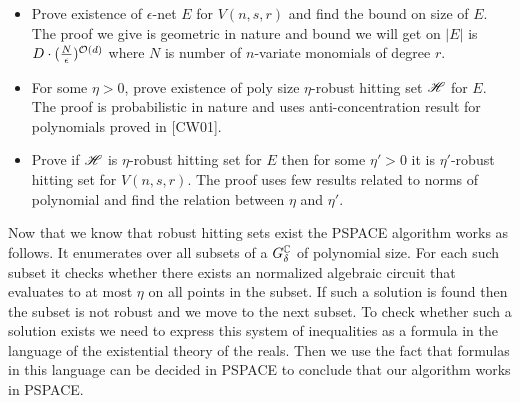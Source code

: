 {\begin{itemize}
\item Prove existence of $\epsilon$-net $E$ for $V(n,s,r)$ and find the bound on size of $E$. The proof we give is geometric in nature and bound we will get on $|E|$ is $D\cdot(\frac{N}{\epsilon})^{\mathcal{O}(d)}$ where $N$ is number of $n$-variate monomials of degree $r$.
\item For some $\eta>0$, prove existence of poly size $\eta$-robust hitting set $\mathscr{H}$ for $E$. The proof is probabilistic in nature and uses anti-concentration result for polynomials proved in [CW01].
\item Prove if $\mathscr{H}$ is $\eta$-robust hitting set for $E$ then for some $\eta'>0$ it is $\eta'$-robust hitting set for $V(n,s,r)$.
The proof uses few results related to norms of polynomial and find the relation between $\eta$ and $\eta'$.
\end{itemize}
Now that we know that robust hitting sets exist the PSPACE algorithm works as follows. It enumerates over all subsets of a $G_\delta^{\mathbb{C}}$ of polynomial size. For each such subset it checks whether there exists an normalized algebraic circuit that evaluates to at most $\eta$ on all points in the subset. If such a solution is found then the subset is not robust and we move to the next subset. To check whether such a solution exists we need to express this system of inequalities as a formula in the language of the existential theory of the reals. Then we use the fact that formulas in this language can be decided in PSPACE to conclude that our algorithm works in PSPACE.
}